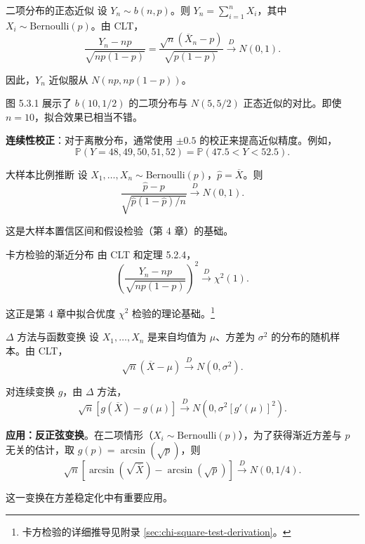 \begin{example}{二项分布的正态近似}\label{ex:binomial-normal-approx}
设 $Y_n \sim b(n,p)$。则 $Y_n = \sum_{i=1}^n X_i$，其中 $X_i \sim \mathrm{Bernoulli}(p)$。由 CLT，
\[
\frac{Y_n - np}{\sqrt{np(1-p)}} = \frac{\sqrt{n}(\overline{X}_n - p)}{\sqrt{p(1-p)}} \xrightarrow{D} N(0,1).
\label{eq:binomial-clt}
\]

因此，$Y_n$ 近似服从 $N(np, np(1-p))$。

图 5.3.1 展示了 $b(10, 1/2)$ 的二项分布与 $N(5, 5/2)$ 正态近似的对比。即使 $n=10$，拟合效果已相当不错。

\textbf{连续性校正}：对于离散分布，通常使用 $\pm 0.5$ 的校正来提高近似精度。例如，
\[
\mathbb{P}(Y = 48, 49, 50, 51, 52) = \mathbb{P}(47.5 < Y < 52.5).
\label{eq:continuity-correction}
\]
\end{example}

\begin{example}{大样本比例推断}\label{ex:proportion-inference}
设 $X_1, \ldots, X_n \sim \mathrm{Bernoulli}(p)$，$\widehat{p} = \overline{X}$。则
\[
\frac{\widehat{p} - p}{\sqrt{\widehat{p}(1-\widehat{p})/n}} \xrightarrow{D} N(0,1).
\label{eq:proportion-clt}
\]

这是大样本置信区间和假设检验（第 4 章）的基础。%
\end{example}

\begin{example}{卡方检验的渐近分布}\label{ex:chi-square-test}
由 CLT 和定理 5.2.4，
\[
\left(\frac{Y_n - np}{\sqrt{np(1-p)}}\right)^2 \xrightarrow{D} \chi^2(1).
\label{eq:chi-square-from-clt}
\]

这正是第 4 章中拟合优度 $\chi^2$ 检验的理论基础。\footnote{卡方检验的详细推导见附录 \cref{sec:chi-square-test-derivation}。}
\end{example}

\begin{example}{$\Delta$ 方法与函数变换}\label{ex:delta-method-variance}
设 $X_1, \ldots, X_n$ 是来自均值为 $\mu$、方差为 $\sigma^2$ 的分布的随机样本。由 CLT，
\[
\sqrt{n}(\overline{X} - \mu) \xrightarrow{D} N(0, \sigma^2).
\label{eq:clt-for-delta}
\]

对连续变换 $g$，由 $\Delta$ 方法，
\[
\sqrt{n}[g(\overline{X}) - g(\mu)] \xrightarrow{D} N(0, \sigma^2 [g'(\mu)]^2).
\label{eq:delta-method-clt}
\]

\textbf{应用：反正弦变换}。在二项情形（$X_i \sim \mathrm{Bernoulli}(p)$），为了获得渐近方差与 $p$ 无关的估计，取 $g(p) = \arcsin(\sqrt{p})$，则
\[
\sqrt{n}[\arcsin(\sqrt{\overline{X}}) - \arcsin(\sqrt{p})] \xrightarrow{D} N(0, 1/4).
\label{eq:arcsin-transform}
\]

这一变换在方差稳定化中有重要应用。%
\end{example}


